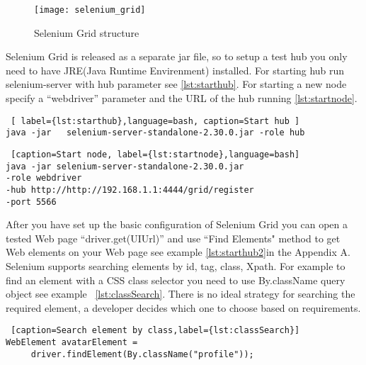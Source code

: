\begin{figure}
\centering
\texttt{[image: selenium\_grid]}
\caption{Selenium Grid structure}
\label{fig:selnium_grid}
\end{figure}

Selenium Grid is released as a separate jar file, so to setup a test hub you
only need to have JRE(Java Runtime Envirenment) installed. For starting hub
run selenium-server with hub parameter see \ref{lst:starthub}. For starting
a new node specify a ``webdriver'' parameter and the URL of the hub running
\ref{lst:startnode}.
		
\lstset{style=console}
\begin{lstlisting} [ label={lst:starthub},language=bash, caption=Start hub ]
java -jar	selenium-server-standalone-2.30.0.jar -role hub
\end{lstlisting}

    \lstset{style=console}
\begin{lstlisting} [caption=Start node, label={lst:startnode},language=bash]
java -jar selenium-server-standalone-2.30.0.jar 
-role webdriver
-hub http://http://192.168.1.1:4444/grid/register
-port 5566
\end{lstlisting}
		

	After you have set up the basic configuration of Selenium Grid you can open a
	tested Web page ``driver.get(UIUrl)'' and use ``Find
	Elements" method to get Web elements on your Web page see example
	\ref{lst:starthub2}in the Appendix A. 
	 Selenium  supports searching elements by id, tag, class, Xpath.
	 For example to find an element with a CSS class selector you need
	 to use By.className query object see example ~\ref{lst:classSearch}. There is no
	  ideal strategy for searching the required element, a developer
	decides which one to choose based on requirements.
	
	\lstset{style=a1listing}
	\begin{lstlisting} [caption=Search element by class,label={lst:classSearch}]
WebElement avatarElement = 
	 driver.findElement(By.className("profile"));
	\end{lstlisting}